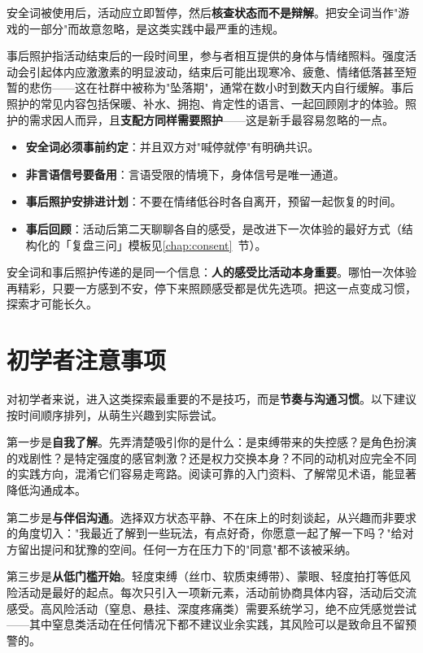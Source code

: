 \documentclass[12pt,UTF8]{ctexbook}
\newcommand{\keyword}[1]{\textbf{#1}}
\begin{document}
安全词被使用后，活动应立即暂停，然后\keyword{核查状态而不是辩解}。把安全词当作"游戏的一部分"而故意忽略，是这类实践中最严重的违规。

事后照护指活动结束后的一段时间里，参与者相互提供的身体与情绪照料。强度活动会引起体内应激激素的明显波动，结束后可能出现寒冷、疲惫、情绪低落甚至短暂的悲伤——这在社群中被称为"坠落期"，通常在数小时到数天内自行缓解。事后照护的常见内容包括保暖、补水、拥抱、肯定性的语言、一起回顾刚才的体验。照护的需求因人而异，且\keyword{支配方同样需要照护}——这是新手最容易忽略的一点。

\begin{itemize}
  \item \keyword{安全词必须事前约定}：并且双方对"喊停就停"有明确共识。
  \item \keyword{非言语信号要备用}：言语受限的情境下，身体信号是唯一通道。
  \item \keyword{事后照护安排进计划}：不要在情绪低谷时各自离开，预留一起恢复的时间。
  \item \keyword{事后回顾}：活动后第二天聊聊各自的感受，是改进下一次体验的最好方式（结构化的「复盘三问」模板见\ref{chap:consent}~节）。
\end{itemize}

\begin{tcolorbox}[colback=pink!5!white,colframe=red!50!black,title=贴心小叮咛]
安全词和事后照护传递的是同一个信息：\keyword{人的感受比活动本身重要}。哪怕一次体验再精彩，只要一方感到不安，停下来照顾感受都是优先选项。把这一点变成习惯，探索才可能长久。
\end{tcolorbox}
\section{初学者注意事项}

对初学者来说，进入这类探索最重要的不是技巧，而是\keyword{节奏与沟通习惯}。以下建议按时间顺序排列，从萌生兴趣到实际尝试。

第一步是\keyword{自我了解}。先弄清楚吸引你的是什么：是束缚带来的失控感？是角色扮演的戏剧性？是特定强度的感官刺激？还是权力交换本身？不同的动机对应完全不同的实践方向，混淆它们容易走弯路。阅读可靠的入门资料、了解常见术语，能显著降低沟通成本。

第二步是\keyword{与伴侣沟通}。选择双方状态平静、不在床上的时刻谈起，从兴趣而非要求的角度切入："我最近了解到一些玩法，有点好奇，你愿意一起了解一下吗？"给对方留出提问和犹豫的空间。任何一方在压力下的"同意"都不该被采纳。

第三步是\keyword{从低门槛开始}。轻度束缚（丝巾、软质束缚带）、蒙眼、轻度拍打等低风险活动是最好的起点。每次只引入一项新元素，活动前协商具体内容，活动后交流感受。高风险活动（窒息、悬挂、深度疼痛类）需要系统学习，绝不应凭感觉尝试——其中窒息类活动在任何情况下都不建议业余实践，其风险可以是致命且不留预警的。
\end{document}
